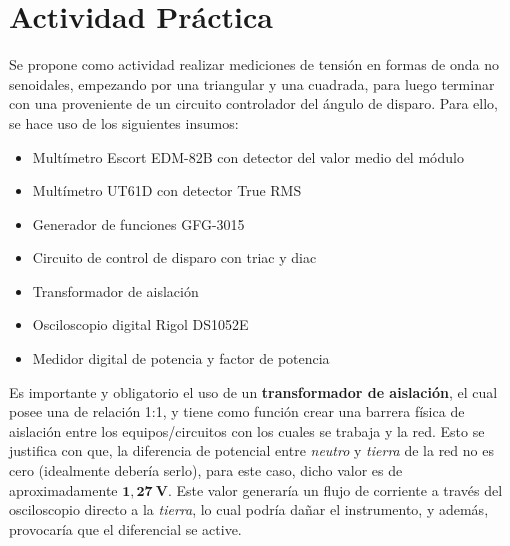   \pagebreak
  \section{Actividad Práctica}
    Se propone como actividad realizar mediciones de tensión en formas de onda no senoidales,
    empezando por una triangular y una cuadrada, para luego terminar con una proveniente
    de un circuito controlador del ángulo de disparo. Para ello, se hace uso de los siguientes
    insumos:

    \begin{itemize}
      \item Multímetro Escort EDM-82B con detector del valor medio del módulo
      \item Multímetro UT61D con detector True RMS
      \item Generador de funciones GFG-3015
      \item Circuito de control de disparo con triac y diac
      \item Transformador de aislación
      \item Osciloscopio digital Rigol DS1052E
      \item Medidor digital de potencia y factor de potencia
    \end{itemize}
    
    Es importante y obligatorio el uso de un \textbf{transformador de aislación},
    el cual posee una de relación 1:1, y tiene como función crear una barrera física de aislación
    entre los equipos/circuitos con los cuales se trabaja y la red. Esto se justifica con que, la diferencia de
    potencial entre \textit{neutro} y \textit{tierra} de la red no es cero (idealmente debería serlo), para este caso, dicho
    valor es de aproximadamente $\mathbf{1,27\ V}$. Este valor generaría un flujo de corriente a través del osciloscopio 
    directo a la \textit{tierra}, lo cual podría dañar el instrumento, y además, provocaría que el diferencial se active.

    
    
    
